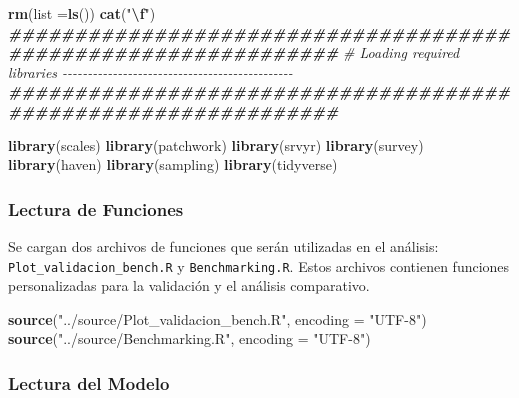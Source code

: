 \documentclass[
  12pt,
]{book}
\newenvironment{Shaded}{\begin{snugshade}}{\end{snugshade}}
\newcommand{\AttributeTok}[1]{\textcolor[rgb]{0.13,0.29,0.53}{#1}}
\newcommand{\CommentTok}[1]{\textcolor[rgb]{0.56,0.35,0.01}{\textit{#1}}}
\newcommand{\DocumentationTok}[1]{\textcolor[rgb]{0.56,0.35,0.01}{\textbf{\textit{#1}}}}
\newcommand{\FunctionTok}[1]{\textcolor[rgb]{0.13,0.29,0.53}{\textbf{#1}}}
\newcommand{\NormalTok}[1]{#1}
\newcommand{\SpecialCharTok}[1]{\textcolor[rgb]{0.81,0.36,0.00}{\textbf{#1}}}
\newcommand{\StringTok}[1]{\textcolor[rgb]{0.31,0.60,0.02}{#1}}
\begin{document}
\begin{Shaded}
\begin{Highlighting}[]
\FunctionTok{rm}\NormalTok{(}\AttributeTok{list =}\FunctionTok{ls}\NormalTok{())}
\FunctionTok{cat}\NormalTok{(}\StringTok{"}\SpecialCharTok{\textbackslash{}f}\StringTok{"}\NormalTok{)}
\DocumentationTok{\#\#\#\#\#\#\#\#\#\#\#\#\#\#\#\#\#\#\#\#\#\#\#\#\#\#\#\#\#\#\#\#\#\#\#\#\#\#\#\#\#\#\#\#\#\#\#\#\#\#\#\#\#\#\#\#\#\#\#\#\#\#\#}
\CommentTok{\# Loading required libraries {-}{-}{-}{-}{-}{-}{-}{-}{-}{-}{-}{-}{-}{-}{-}{-}{-}{-}{-}{-}{-}{-}{-}{-}{-}{-}{-}{-}{-}{-}{-}{-}{-}{-}{-}{-}{-}{-}{-}{-}{-}{-}{-}{-}{-}{-}}
\DocumentationTok{\#\#\#\#\#\#\#\#\#\#\#\#\#\#\#\#\#\#\#\#\#\#\#\#\#\#\#\#\#\#\#\#\#\#\#\#\#\#\#\#\#\#\#\#\#\#\#\#\#\#\#\#\#\#\#\#\#\#\#\#\#\#\#}

\FunctionTok{library}\NormalTok{(scales)}
\FunctionTok{library}\NormalTok{(patchwork)}
\FunctionTok{library}\NormalTok{(srvyr)}
\FunctionTok{library}\NormalTok{(survey)}
\FunctionTok{library}\NormalTok{(haven)}
\FunctionTok{library}\NormalTok{(sampling)}
\FunctionTok{library}\NormalTok{(tidyverse)}
\end{Highlighting}
\end{Shaded}

\hypertarget{lectura-de-funciones-1}{%
\subsubsection*{Lectura de Funciones}\label{lectura-de-funciones-1}}

Se cargan dos archivos de funciones que serán utilizadas en el análisis: \texttt{Plot\_validacion\_bench.R} y \texttt{Benchmarking.R}. Estos archivos contienen funciones personalizadas para la validación y el análisis comparativo.

\begin{Shaded}
\begin{Highlighting}[]
\FunctionTok{source}\NormalTok{(}\StringTok{"../source/Plot\_validacion\_bench.R"}\NormalTok{, }\AttributeTok{encoding =} \StringTok{"UTF{-}8"}\NormalTok{)}
\FunctionTok{source}\NormalTok{(}\StringTok{"../source/Benchmarking.R"}\NormalTok{, }\AttributeTok{encoding =} \StringTok{"UTF{-}8"}\NormalTok{)}
\end{Highlighting}
\end{Shaded}

\hypertarget{lectura-del-modelo-1}{%
\subsubsection*{Lectura del Modelo}\label{lectura-del-modelo-1}}
\end{document}

